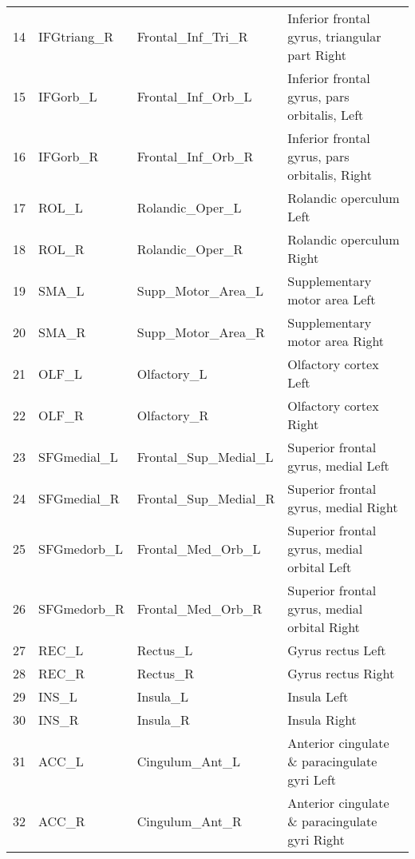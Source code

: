\documentclass[12pt,reqno]{amsart}
\theoremstyle{definition}
\begin{document}
\begin{longtable}{rlll}
 14 & IFGtriang\_R &    Frontal\_Inf\_Tri\_R &      Inferior frontal gyrus, triangular part Right \\
 15 &    IFGorb\_L &    Frontal\_Inf\_Orb\_L &       Inferior frontal gyrus, pars orbitalis, Left \\
 16 &    IFGorb\_R &    Frontal\_Inf\_Orb\_R &      Inferior frontal gyrus, pars orbitalis, Right \\
 17 &       ROL\_L &      Rolandic\_Oper\_L &                            Rolandic operculum Left \\
 18 &       ROL\_R &      Rolandic\_Oper\_R &                           Rolandic operculum Right \\
 19 &       SMA\_L &    Supp\_Motor\_Area\_L &                      Supplementary motor area Left \\
 20 &       SMA\_R &    Supp\_Motor\_Area\_R &                     Supplementary motor area Right \\
 21 &       OLF\_L &          Olfactory\_L &                              Olfactory cortex Left \\
 22 &       OLF\_R &          Olfactory\_R &                             Olfactory cortex Right \\
 23 & SFGmedial\_L & Frontal\_Sup\_Medial\_L &                Superior frontal gyrus, medial Left \\
 24 & SFGmedial\_R & Frontal\_Sup\_Medial\_R &               Superior frontal gyrus, medial Right \\
 25 & SFGmedorb\_L &    Frontal\_Med\_Orb\_L &        Superior frontal gyrus, medial orbital Left \\
 26 & SFGmedorb\_R &    Frontal\_Med\_Orb\_R &       Superior frontal gyrus, medial orbital Right \\
 27 &       REC\_L &             Rectus\_L &                                  Gyrus rectus Left \\
 28 &       REC\_R &             Rectus\_R &                                 Gyrus rectus Right \\
 29 &       INS\_L &             Insula\_L &                                        Insula Left \\
 30 &       INS\_R &             Insula\_R &                                       Insula Right \\
 31 &       ACC\_L &       Cingulum\_Ant\_L &       Anterior cingulate \& paracingulate gyri Left \\
 32 &       ACC\_R &       Cingulum\_Ant\_R &      Anterior cingulate \& paracingulate gyri Right \\

\end{longtable}
\end{document}
